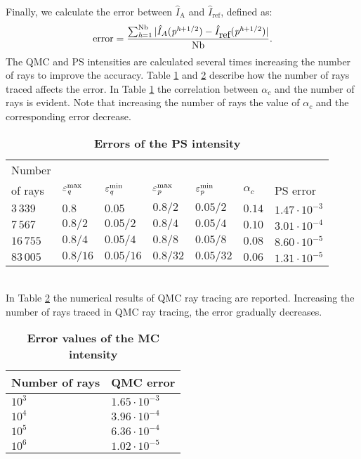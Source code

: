 Finally, we calculate the error between $\hat{I}_{\textrm{A}}$ and $\hat{I}_{\textrm{ref}}$, defined as:
\begin{equation}\label{eq:error}
\mbox{error} = \frac{\sum_{\textit{h}= 1}^{\textrm{Nb}}| \hat{I}_{A}(\textit{p}^{\textit{h}+1/2}) - \hat{I}_{\mbox{ref}}(\textit{p}^{\textit{h}+1/2})|}{\textrm{Nb}}.
\end{equation}
The QMC and PS intensities are calculated several times increasing the number of rays to improve the accuracy.
Table \ref{tab:table} and \ref{tab:table2} describe how the number of rays traced affects the error. 
In Table \ref{tab:table} the correlation between $\alpha_c$ and the number of rays is evident.
Note that increasing the number of rays the value of $\alpha_c$ and the corresponding error decrease. 
\begin{table}[htbp] \label{tab:table}
\centering
\caption{\bf Errors of the PS intensity}
\begin{tabular}{lllllll}
 \hline  Number \\ of rays\;  & $\varepsilon^{\textrm{max}}_{\textit{q}} $  & $\varepsilon^{\textrm{min}}_{\textit{q}} $   \;     & $\varepsilon^{\textrm{max}}_{\textit{p}}$\;
  & $\varepsilon^{\textrm{min}}_{\textit{p}}$\; & $\alpha_c$  & PS error \\
  \hline 
 $3\,339$ & $0.8$  & $0.05$  & $0.8/2$  & $0.05/2$ & $0.14$ & $1.47\cdot10^{-3}$ \\
$7\,567$  & $0.8/2$  & $0.05/2$  & $0.8/4$  & $0.05/4$ & $0.10$ & $3.01\cdot 10^{-4}$  \\
$16\,755$  & $0.8/4$  & $0.05/4$  & $0.8/8$  & $0.05/8$ & $0.08$ & $8.60\cdot 10^{-5}$ \\
 $83\,005$ & $0.8/16$  & $0.05/16$  & $0.8/32$  & $0.05/32$ & $0.06$ & $1.31\cdot 10^{-5}$ \\
 \hline
 \end{tabular}
 \label{tab:table}
 \end{table}
\\ \indent In Table \ref{tab:table2} the numerical results of QMC ray tracing are reported.
Increasing the number of rays traced in QMC ray tracing, the error gradually decreases.
\begin{table}[htbp]
\centering
\caption{\bf Error values of the MC intensity}
\begin{tabular}{ll} \hline   Number of rays\; & QMC error\\
 \hline $10^3$  & $1.65\cdot10^{-3}$ \\
$10^4$  & $3.96\cdot 10^{-4}$  \\
 $10^5$  & $6.36\cdot 10^{-4}$ \\ 
$10^6$  & $1.02\cdot 10^{-5}$ \\
 \hline
 \end{tabular}
 \label{tab:table2}
 \end{table}
